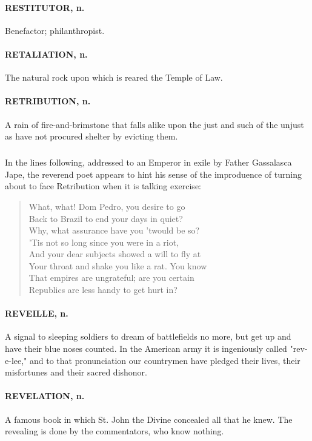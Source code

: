 \documentclass[11pt]{article}
\begin{document}
\paragraph{RESTITUTOR, n.}  Benefactor; philanthropist.

\paragraph{RETALIATION, n.}  The natural rock upon which is reared the Temple of
Law.

\paragraph{RETRIBUTION, n.}  A rain of fire-and-brimstone that falls alike upon
the just and such of the unjust as have not procured shelter by
evicting them.
\subparagraph{}   In the lines following, addressed to an Emperor in exile by Father
Gassalasca Jape, the reverend poet appears to hint his sense of the
improduence of turning about to face Retribution when it is talking
exercise:

\begin{quote}   What, what! Dom Pedro, you desire to go \\
      Back to Brazil to end your days in quiet? \\
  Why, what assurance have you 'twould be so? \\
      'Tis not so long since you were in a riot, \\
      And your dear subjects showed a will to fly at \\
  Your throat and shake you like a rat.  You know \\
  That empires are ungrateful; are you certain \\
  Republics are less handy to get hurt in?  \end{quote}

\paragraph{REVEILLE, n.}  A signal to sleeping soldiers to dream of battlefields
no more, but get up and have their blue noses counted.  In the
American army it is ingeniously called "rev-e-lee," and to that
pronunciation our countrymen have pledged their lives, their
misfortunes and their sacred dishonor.

\paragraph{REVELATION, n.}  A famous book in which St. John the Divine concealed
all that he knew.  The revealing is done by the commentators, who know
nothing.
\end{document}
